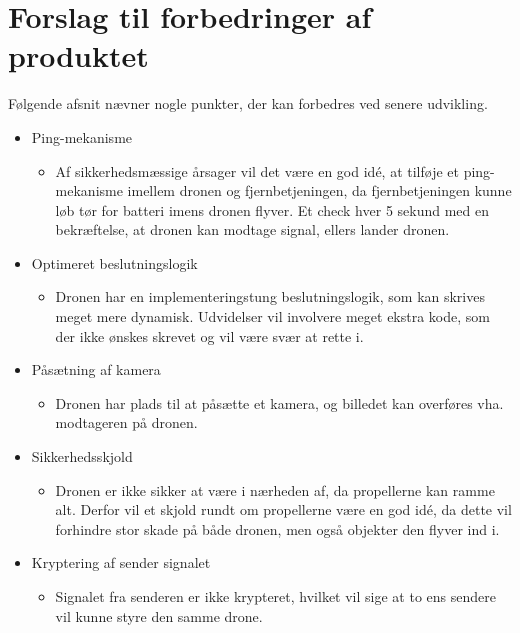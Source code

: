 \documentclass[Main]{subfiles}
\begin{document}
\section{Forslag til forbedringer af produktet}

Følgende afsnit nævner nogle punkter, der kan forbedres ved senere udvikling.
\vspace{-20pt}
\begin{itemize}
\item Ping-mekanisme
\vspace{-10pt}
	\begin{itemize}
	\item Af sikkerhedsmæssige årsager vil det være en god idé, at tilføje et ping-mekanisme imellem dronen og fjernbetjeningen, da fjernbetjeningen kunne løb tør for batteri imens dronen flyver. 
	Et check hver 5 sekund med en bekræftelse, at dronen kan modtage signal, ellers lander dronen.
	\end{itemize}

\item Optimeret beslutningslogik
\vspace{-10pt}
	\begin{itemize}
	\item Dronen har en implementeringstung beslutningslogik, som kan skrives meget mere dynamisk. Udvidelser vil involvere meget ekstra kode, som der ikke ønskes skrevet og vil være svær at rette i.
	\end{itemize}
	
\item Påsætning af kamera
\vspace{-10pt}
	\begin{itemize}
	\item Dronen har plads til at påsætte et kamera, og billedet kan overføres vha. modtageren på dronen.
	\end{itemize}
	
\item Sikkerhedsskjold
\vspace{-10pt}
	\begin{itemize}
	\item Dronen er ikke sikker at være i nærheden af, da propellerne kan ramme alt.
Derfor vil et skjold rundt om propellerne være en god idé, da dette vil forhindre stor skade på både dronen, men også objekter den flyver ind i.
	\end{itemize}

	
\item Kryptering af sender signalet
\vspace{-10pt}
	\begin{itemize}
	\item Signalet fra senderen er ikke krypteret, hvilket vil sige at to ens sendere vil kunne styre den samme drone.
	\end{itemize}



\end{itemize}
\end{document}
